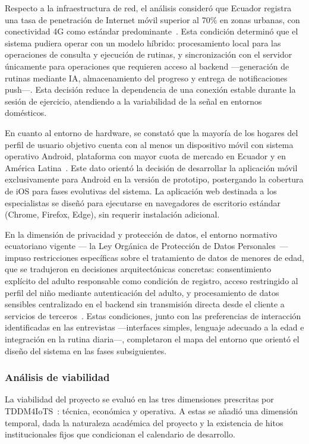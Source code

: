 					Respecto a la infraestructura de red, el análisis consideró que Ecuador registra una tasa de penetración de Internet móvil superior al 70\% en zonas urbanas, con conectividad 4G como estándar predominante~\cite{Baumann2022}. Esta condición determinó que el sistema pudiera operar con un modelo híbrido: procesamiento local para las operaciones de consulta y ejecución de rutinas, y sincronización con el servidor únicamente para operaciones que requieren acceso al backend ---generación de rutinas mediante IA, almacenamiento del progreso y entrega de notificaciones push---. Esta decisión reduce la dependencia de una conexión estable durante la sesión de ejercicio, atendiendo a la variabilidad de la señal en entornos domésticos.
					
					En cuanto al entorno de hardware, se constató que la mayoría de los hogares del perfil de usuario objetivo cuenta con al menos un dispositivo móvil con sistema operativo Android, plataforma con mayor cuota de mercado en Ecuador y en América Latina~\cite{Schoeppe2017}. Este dato orientó la decisión de desarrollar la aplicación móvil exclusivamente para Android en la versión de prototipo, postergando la cobertura de iOS para fases evolutivas del sistema. La aplicación web destinada a los especialistas se diseñó para ejecutarse en navegadores de escritorio estándar (Chrome, Firefox, Edge), sin requerir instalación adicional.
					
					En la dimensión de privacidad y protección de datos, el entorno normativo ecuatoriano vigente --- la Ley Orgánica de Protección de Datos Personales~\cite{LOPDP2021}--- impuso restricciones específicas sobre el tratamiento de datos de menores de edad, que se tradujeron en decisiones arquitectónicas concretas: consentimiento explícito del adulto responsable como condición de registro, acceso restringido al perfil del niño mediante autenticación del adulto, y procesamiento de datos sensibles centralizado en el backend sin transmisión directa desde el cliente a servicios de terceros~\cite{LOPDP2021,GDPR2016}. Estas condiciones, junto con las preferencias de interacción identificadas en las entrevistas ---interfaces simples, lenguaje adecuado a la edad e integración en la rutina diaria---, completaron el mapa del entorno que orientó el diseño del sistema en las fases subsiguientes.


				\subsubsection{Análisis de viabilidad}
					La viabilidad del proyecto se evaluó en las tres dimensiones prescritas por TDDM4IoTS~\cite{GuerreroUlloa2024}: técnica, económica y operativa. A estas se añadió una dimensión temporal, dada la naturaleza académica del proyecto y la existencia de hitos institucionales fijos que condicionan el calendario de desarrollo.
					
